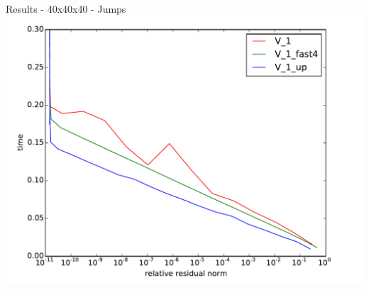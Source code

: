 \documentclass{beamer}
\begin{document}
\begin{frame}{Results - 40x40x40 - Jumps}
 \includegraphics[width=\linewidth]{AMG2006/test/DELL/jumps/time_convergence_fast.pdf}
\end{frame}
\end{document}
